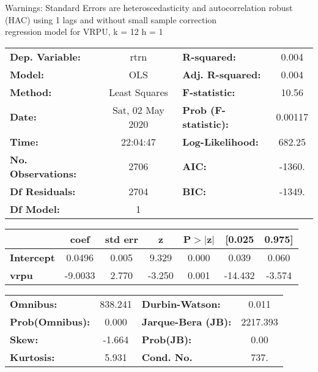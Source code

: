 Warnings: \newline
 [1] Standard Errors are heteroscedasticity and autocorrelation robust (HAC) using 1 lags and without small sample correction\\ 

regression model for VRPU, k = 12 h = 1\begin{center}
\begin{tabular}{lclc}
\toprule
\textbf{Dep. Variable:}    &       rtrn       & \textbf{  R-squared:         } &     0.004   \\
\textbf{Model:}            &       OLS        & \textbf{  Adj. R-squared:    } &     0.004   \\
\textbf{Method:}           &  Least Squares   & \textbf{  F-statistic:       } &     10.56   \\
\textbf{Date:}             & Sat, 02 May 2020 & \textbf{  Prob (F-statistic):} &  0.00117    \\
\textbf{Time:}             &     22:04:47     & \textbf{  Log-Likelihood:    } &    682.25   \\
\textbf{No. Observations:} &        2706      & \textbf{  AIC:               } &    -1360.   \\
\textbf{Df Residuals:}     &        2704      & \textbf{  BIC:               } &    -1349.   \\
\textbf{Df Model:}         &           1      & \textbf{                     } &             \\
\bottomrule
\end{tabular}
\begin{tabular}{lcccccc}
                   & \textbf{coef} & \textbf{std err} & \textbf{z} & \textbf{P$> |$z$|$} & \textbf{[0.025} & \textbf{0.975]}  \\
\midrule
\textbf{Intercept} &       0.0496  &        0.005     &     9.329  &         0.000        &        0.039    &        0.060     \\
\textbf{vrpu}      &      -9.0033  &        2.770     &    -3.250  &         0.001        &      -14.432    &       -3.574     \\
\bottomrule
\end{tabular}
\begin{tabular}{lclc}
\textbf{Omnibus:}       & 838.241 & \textbf{  Durbin-Watson:     } &    0.011  \\
\textbf{Prob(Omnibus):} &   0.000 & \textbf{  Jarque-Bera (JB):  } & 2217.393  \\
\textbf{Skew:}          &  -1.664 & \textbf{  Prob(JB):          } &     0.00  \\
\textbf{Kurtosis:}      &   5.931 & \textbf{  Cond. No.          } &     737.  \\
\bottomrule
\end{tabular}
\end{center}


